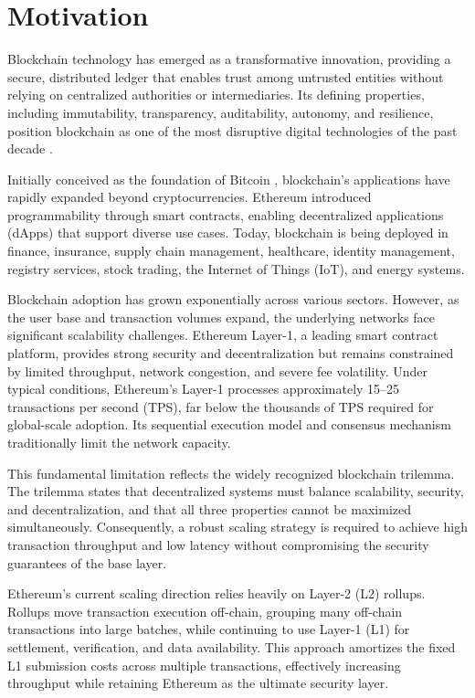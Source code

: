 \section{Motivation}
\label{sec:motivation}

Blockchain technology has emerged as a transformative innovation, providing a secure, distributed ledger that enables trust among untrusted entities without relying on centralized authorities or intermediaries. Its defining properties, including immutability, transparency, auditability, autonomy, and resilience, position blockchain as one of the most disruptive digital technologies of the past decade \citep{sanka2021systematic}.

Initially conceived as the foundation of Bitcoin \citep{nakamoto2008bitcoin}, blockchain’s applications have rapidly expanded beyond cryptocurrencies. Ethereum \citep{buterin2014ethereum} introduced programmability through smart contracts, enabling decentralized applications (dApps) that support diverse use cases. Today, blockchain is being deployed in finance, insurance, supply chain management, healthcare, identity management, registry services, stock trading, the Internet of Things (IoT), and energy systems.

Blockchain adoption has grown exponentially across various sectors. However, as the user base and transaction volumes expand, the underlying networks face significant scalability challenges. Ethereum Layer-1, a leading smart contract platform, provides strong security and decentralization but remains constrained by limited throughput, network congestion, and severe fee volatility. Under typical conditions, Ethereum's Layer-1 processes approximately 15–25 transactions per second (TPS), far below the thousands of TPS required for global-scale adoption. Its sequential execution model and consensus mechanism traditionally limit the network capacity.

This fundamental limitation reflects the widely recognized blockchain trilemma. The trilemma states that decentralized systems must balance scalability, security, and decentralization, and that all three properties cannot be maximized simultaneously. Consequently, a robust scaling strategy is required to achieve high transaction throughput and low latency without compromising the security guarantees of the base layer.

Ethereum's current scaling direction relies heavily on Layer-2 (L2) rollups. Rollups move transaction execution off-chain, grouping many off-chain transactions into large batches, while continuing to use Layer-1 (L1) for settlement, verification, and data availability. This approach amortizes the fixed L1 submission costs across multiple transactions, effectively increasing throughput while retaining Ethereum as the ultimate security layer.

